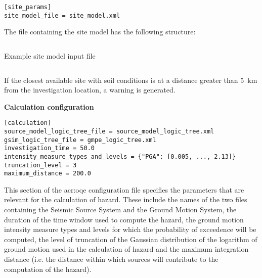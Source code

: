 \begin{verbatim}
[site_params]
site_model_file = site_model.xml
\end{verbatim}

The file containing the site model has the following structure:

\begin{listing}[htbp]
  \inputminted[firstline=1,firstnumber=1,fontsize=\footnotesize,frame=single,linenos,bgcolor=lightgray]{xml}{oqum/hazard/verbatim/input_site_model.xml}
  \caption{Example site model input file}
  \label{lst:input_site_model}
\end{listing}
\begin{verbatim}

\end{verbatim}

If the closest available site with soil conditions is at a distance greater than 5~km from the investigation location, a warning is generated.

\textbf{Calculation configuration}
\label{sec:calculation_configuration}

\begin{verbatim}
[calculation]
source_model_logic_tree_file = source_model_logic_tree.xml
gsim_logic_tree_file = gmpe_logic_tree.xml
investigation_time = 50.0
intensity_measure_types_and_levels = {"PGA": [0.005, ..., 2.13]}
truncation_level = 3
maximum_distance = 200.0
\end{verbatim}

This section of the \gls{acr:oqe} configuration file specifies the parameters
that are relevant for the calculation of hazard. These include the names of
the two files containing the Seismic Source System and the Ground Motion
System, the duration of the time window used to compute the  hazard, the
ground motion intensity measure types and levels for  which the probability of
exceedence will be computed, the level of truncation of the Gaussian
distribution of the logarithm of ground motion used in the calculation of
hazard and the maximum integration distance (i.e. the distance within which
sources will contribute to the computation of the hazard).

